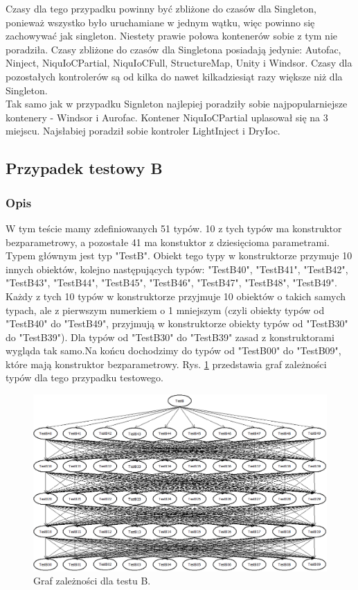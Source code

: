 \documentclass[12pt]{article}
\begin{document}
Czasy dla tego przypadku powinny być zbliżone do czasów dla Singleton, ponieważ wszystko było uruchamiane w jednym wątku, więc powinno się zachowywać jak singleton. Niestety prawie połowa kontenerów sobie z tym nie poradziła. Czasy zbliżone do czasów dla Singletona posiadają jedynie: Autofac, Ninject, NiquIoCPartial, NiquIoCFull, StructureMap, Unity i Windsor. Czasy dla pozostałych kontrolerów są od kilka do nawet kilkadziesiąt razy większe niż dla Singleton.\\
Tak samo jak w przypadku Signleton najlepiej poradziły sobie najpopularniejsze kontenery - Windsor i Aurofac. Kontener NiquIoCPartial uplasował się na 3 miejscu. Najsłabiej poradził sobie kontroler LightInject i DryIoc.


\subsection{Przypadek testowy B}
\subsubsection{Opis}
W tym teście mamy zdefiniowanych 51 typów. 10 z tych typów ma konstruktor bezparametrowy, a pozostałe 41 ma konstuktor z dziesięcioma parametrami. Typem głównym jest typ "TestB". Obiekt tego typy w konstruktorze przymuje 10 innych obiektów, kolejno następujących typów: "TestB40", "TestB41", "TestB42", "TestB43", "TestB44", "TestB45", "TestB46", "TestB47", "TestB48", "TestB49". Każdy z tych 10 typów w konstruktorze przyjmuje 10 obiektów o takich samych typach, ale z pierwszym numerkiem o 1 mniejszym (czyli obiekty typów od "TestB40" do "TestB49", przyjmują w konstruktorze obiekty typów od "TestB30" do "TestB39"). Dla typów od "TestB30" do "TestB39" zasad z konstruktorami wygląda tak samo.Na końcu dochodzimy do typów od "TestB00" do "TestB09", które mają konstruktor bezparametrowy. Rys. \ref{fig:testB} przedstawia graf zależności typów dla tego przypadku testowego.

\clearpage
\begin{figure}[h]
	\begin{center}
  		\includegraphics[width=\linewidth]{TestB.png}
  		\caption{Graf zależności dla testu B.}
  		\label{fig:testB}
	\end{center}
\end{figure}
\end{document}
